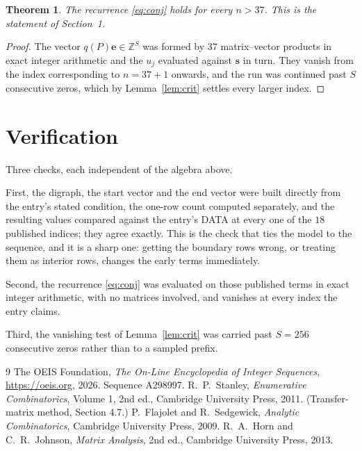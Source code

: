 \documentclass[11pt,a4paper]{article}
\theoremstyle{plain}
\newtheorem{theorem}{Theorem}
\theoremstyle{definition}
\begin{document}
\begin{theorem}
The recurrence \eqref{eq:conj} holds for every $n>37$. This is the statement of
Section~1.
\end{theorem}

\begin{proof}
The vector $q(P)\mathbf{e}\in\mathbb{Z}^{S}$ was formed by $37$ matrix--vector
products in exact integer arithmetic and the $u_j$ evaluated against $\mathbf{s}$ in turn.
They vanish from the index corresponding to $n=37+1$ onwards, and the run was continued
past $S$ consecutive zeros, which by Lemma~\ref{lem:crit} settles every larger index.
\end{proof}

\section{Verification}

Three checks, each independent of the algebra above.

First, the digraph, the start vector and the end vector were built directly from the
entry's stated condition, the one-row count computed separately, and the resulting values
compared against the entry's DATA at every one of the $18$ published indices; they
agree exactly. This is the check that ties the model to the sequence, and it is a sharp one:
getting the boundary rows wrong, or treating them as interior rows, changes the early terms
immediately.

Second, the recurrence \eqref{eq:conj} was evaluated on those published terms in exact
integer arithmetic, with no matrices involved, and vanishes at every index the entry claims.

Third, the vanishing test of Lemma~\ref{lem:crit} was carried past $S=256$ consecutive
zeros rather than to a sampled prefix.

\begin{thebibliography}{9}
 The OEIS Foundation, \emph{The On-Line Encyclopedia of Integer
Sequences}, \url{https://oeis.org}, 2026. Sequence A298997.
 R.~P.~Stanley, \emph{Enumerative Combinatorics}, Volume 1, 2nd ed.,
Cambridge University Press, 2011. (Transfer-matrix method, Section 4.7.)
 P.~Flajolet and R.~Sedgewick, \emph{Analytic Combinatorics}, Cambridge
University Press, 2009.
 R.~A.~Horn and C.~R.~Johnson, \emph{Matrix Analysis}, 2nd ed., Cambridge
University Press, 2013.
\end{thebibliography}
\end{document}
